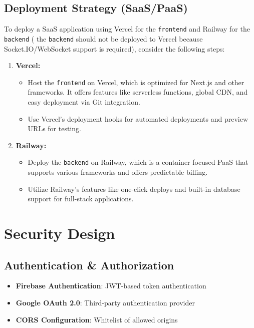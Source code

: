 \subsection*{Deployment Strategy (SaaS/PaaS)}
To deploy a SaaS application using Vercel for the \texttt{frontend} and Railway for the \texttt{backend} ({\color{orange}{Warning:}} the \texttt{backend} should not be deployed to Vercel because Socket.IO/WebSocket support is required), consider the following steps:
\begin{enumerate}
    \item \textbf{Vercel:}
    \begin{itemize}
        \item Host the \texttt{frontend} on Vercel, which is optimized for Next.js and other frameworks. It offers features like serverless functions, global CDN, and easy deployment via Git integration.
        \item Use Vercel's deployment hooks for automated deployments and preview URLs for testing.
    \end{itemize}
    
    \item \textbf{Railway:}
    \begin{itemize}
        \item Deploy the \texttt{backend} on Railway, which is a container-focused PaaS that supports various frameworks and offers predictable billing.
        \item Utilize Railway's features like one-click deploys and built-in database support for full-stack applications.
    \end{itemize}
\end{enumerate}

\section*{Security Design}

\subsection*{Authentication \& Authorization}

\begin{itemize}
    \item \textbf{Firebase Authentication}: JWT-based token authentication
    \item \textbf{Google OAuth 2.0}: Third-party authentication provider
    \item \textbf{CORS Configuration}: Whitelist of allowed origins
\end{itemize}

